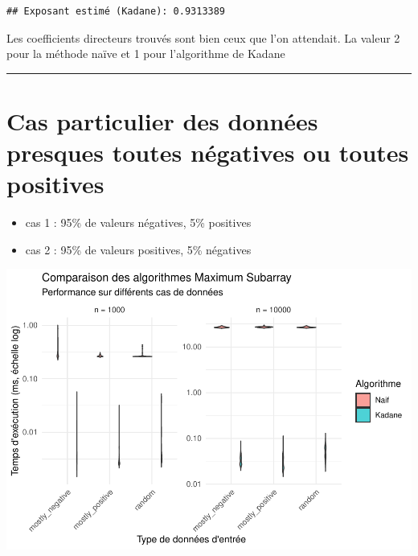\documentclass[
]{article}
\providecommand{\tightlist}{%
  \setlength{\itemsep}{0pt}\setlength{\parskip}{0pt}}
\begin{document}
\begin{verbatim}
## Exposant estimé (Kadane): 0.9313389
\end{verbatim}

Les coefficients directeurs trouvés sont bien ceux que l'on attendait.
La valeur 2 pour la méthode naïve et 1 pour l'algorithme de Kadane

\begin{center}\rule{0.5\linewidth}{0.5pt}\end{center}

\section{Cas particulier des données presques toutes négatives ou toutes
positives}\label{cas-particulier-des-donnuxe9es-presques-toutes-nuxe9gatives-ou-toutes-positives}

\begin{itemize}
\tightlist
\item
  cas 1 : 95\% de valeurs négatives, 5\% positives
\item
  cas 2 : 95\% de valeurs positives, 5\% négatives
\end{itemize}

\includegraphics{MaxSubarray1D_files/figure-latex/benchmark2-1.pdf}
\end{document}
